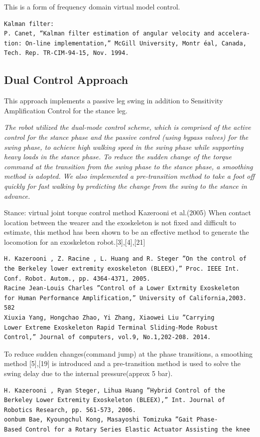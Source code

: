 \documentclass[letterpaper,12pt,fullpage]{article}
\begin{document}
This is a form of frequency domain virtual model control.

\begin{verbatim}
Kalman filter:
P. Canet, “Kalman filter estimation of angular velocity and accelera-
tion: On-line implementation,” McGill University, Montr ́eal, Canada,
Tech. Rep. TR-CIM-94-15, Nov. 1994.
\end{verbatim}

\subsection{Dual Control Approach}

This approach implements a passive leg swing in addition to Sensitivity 
Amplification Control for the stance leg.

{\it The robot utilized the dual-mode control scheme, which is
comprised of the active control for the stance phase and the
passive control (using bypass valves) for the swing phase, to achieve high walking
speed in the swing phase while supporting heavy loads in
the stance phase. To reduce the sudden change of the torque
command at the transition from the swing phase to the stance
phase, a smoothing method is adopted. We also implemented
a pre-transition method to take a foot off quickly for fast
walking by predicting the change from the swing to the stance
in advance.}~\cite{IEEE07222598}


Stance: virtual joint torque control method Kazerooni et al.(2005)
When contact location between the wearer and the
exoskeleton is not fixed and difficult to estimate, this method
has been shown to be an effective method to generate the
locomotion for an exoskeleton robot.[3],[4],[21]
\begin{verbatim}
H. Kazerooni , Z. Racine , L. Huang and R. Steger ”On the control of
the Berkeley lower extremity exoskeleton (BLEEX),” Proc. IEEE Int.
Conf. Robot. Autom., pp. 4364-4371, 2005.
Racine Jean-Louis Charles ”Control of a Lower Extrmity Exoskeleton
for Human Performance Amplification,” University of California,2003.
582
Xiuxia Yang, Hongchao Zhao, Yi Zhang, Xiaowei Liu ”Carrying
Lower Extreme Exoskeleton Rapid Terminal Sliding-Mode Robust
Control,” Journal of computers, vol.9, No.1,202-208. 2014.
\end{verbatim}

To reduce
sudden changes(command jump) at the phase transitions, a
smoothing method [5],[19] is introduced and a pre-transition
method is used to solve the swing delay due to the internal
pressure(approx 5 bar).
\begin{verbatim}
H. Kazerooni , Ryan Steger, Lihua Huang ”Hybrid Control of the
Berkeley Lower Extremity Exoskeleton (BLEEX),” Int. Journal of
Robotics Research, pp. 561-573, 2006.
oonbum Bae, Kyoungchul Kong, Masayoshi Tomizuka ”Gait Phase-
Based Control for a Rotary Series Elastic Actuator Assisting the knee
\end{verbatim}
\end{document}
